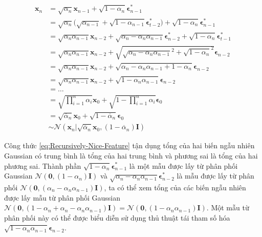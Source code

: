 \documentclass[14pt, a4paper]{article}
\numberwithin{equation}{section}
\numberwithin{figure}{section}
\numberwithin{dl}{section}
\numberwithin{md}{section}
\numberwithin{bd}{section}
\numberwithin{dn}{section}
\numberwithin{hq}{section}
\begin{document}
    \begin{equation} \label{eq:Recursively-Nice-Feature}
        \begin{aligned}
            \boldsymbol{x}_n &= \sqrt{\alpha_n} \boldsymbol{x}_{n-1} + \sqrt{1 - \alpha_n} \boldsymbol{\epsilon}_{n-1}^{\ast} \\
            &= \sqrt{\alpha_n} \big( \sqrt{\alpha_{n-1}} + \sqrt{1 - \alpha_{n-1}} \boldsymbol{\epsilon}_{t-2}^{\ast} \big) + \sqrt{1 - \alpha_n} \boldsymbol{\epsilon}_{n-1}^{\ast} \\
            &= \sqrt{\alpha_n \alpha_{n-1}} \boldsymbol{x}_{n-2} + \sqrt{\alpha_n - \alpha_n \alpha_{n-1}} \boldsymbol{\epsilon}_{n-2}^{\ast} + \sqrt{1 - \alpha_n} \boldsymbol{\epsilon}_{t-1}^{\ast} \\
            &= \sqrt{\alpha_n \alpha_{n-1}} \boldsymbol{x}_{n-2} + \sqrt{\sqrt{\alpha_n - \alpha_n \alpha_{n-1}}^2 + \sqrt{1 - \alpha_n}^2} \boldsymbol{\epsilon}_{n-2} \\
            &= \sqrt{\alpha_n \alpha_{n-1}} \boldsymbol{x}_{n-2} + \sqrt{\alpha_n - \alpha_n \alpha_{n-1} + 1 - \alpha_n} \boldsymbol{\epsilon}_{n-2} \\
            &= \sqrt{\alpha_n \alpha_{n-1}} \boldsymbol{x}_{n-2} + \sqrt{1 - \alpha_n \alpha_{n-1}} \boldsymbol{\epsilon}_{n-2} \\
            &= \hdots \\
            &= \sqrt{\prod_{i=1}^n \alpha_i} \boldsymbol{x}_0 + \sqrt{1 - \prod_{i=1}^n \alpha_i} \boldsymbol{\epsilon}_0 \\
            &= \sqrt{\overline{\alpha}_n} \boldsymbol{x}_0 + \sqrt{1 - \overline{\alpha}_n} \boldsymbol{\epsilon}_0 \\
            &\sim \mathcal{N} (\boldsymbol{x}_n \vert \sqrt{\overline{\alpha}_n}\boldsymbol{x}_0, (1 - \overline{\alpha}_n)\boldsymbol{I})
        \end{aligned}
    \end{equation}

    Công thức \ref{eq:Recursively-Nice-Feature} tận dụng tổng của hai biến ngẫu nhiên Gaussian có trung bình là tổng của hai trung bình và phương sai là tổng của hai phương sai.
    Thành phần $\sqrt{1 - \alpha_n}\boldsymbol{\epsilon}_{n-1}^{\ast}$ là một mẫu được lấy từ phân phối Gaussian $\mathcal{N} (\boldsymbol{0}, (1 - \alpha_n)\boldsymbol{I})$ và $\sqrt{\alpha_n - \alpha_n \alpha_{n-1}} \boldsymbol{\epsilon}_{n-2}^{\ast}$ là mẫu được lấy từ phân phối $\mathcal{N} (\boldsymbol{0}, (\alpha_n - \alpha_n \alpha_{n-1})\boldsymbol{I})$, ta có thể xem tổng của các biến ngẫu nhiên được lấy mẫu từ phân phối Gaussian $\mathcal{N} (\boldsymbol{0}, (1 - \alpha_n + \alpha_n - \alpha_n \alpha_{n-1}) \boldsymbol{I})=\mathcal{N} (\boldsymbol{0}, (1 - \alpha_n \alpha_{n-1}) \boldsymbol{I})$.
    Một mẫu từ phân phối này có thể được biểu diễn sử dụng thủ thuật tái tham số hóa $\sqrt{1 - \alpha_n \alpha_{n-1}} \boldsymbol{\epsilon}_{n-2}$.
\end{document}
